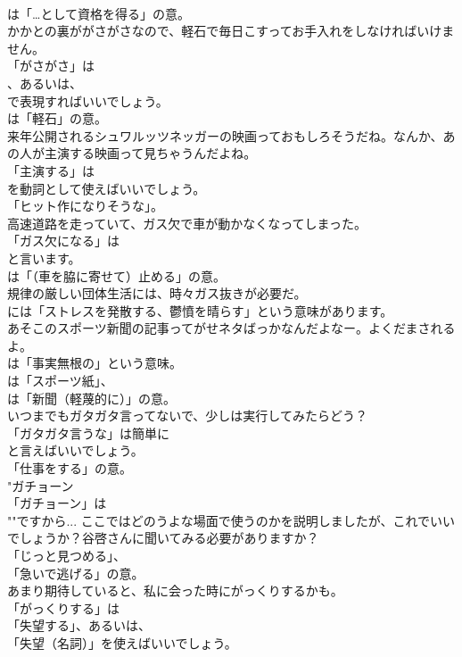 \documentclass[8pt]{extreport}
\begin{document}
\begin{CJK}{UTF8}{min}
\\	は「…として資格を得る」の意。	
\\	かかとの裏ががさがさなので、軽石で毎日こすってお手入れをしなければいけません。 
\\	「がさがさ」は 
\\	、あるいは、
\\	で表現すればいいでしょう。
\\	は「軽石」の意。	
\\	来年公開されるシュワルッツネッガーの映画っておもしろそうだね。なんか、あの人が主演する映画って見ちゃうんだよね。 
\\	「主演する」は
\\	を動詞として使えばいいでしょう。
\\	「ヒット作になりそうな」。	
\\	高速道路を走っていて、ガス欠で車が動かなくなってしまった。 
\\	「ガス欠になる」は 
\\	と言います。
\\	は「（車を脇に寄せて）止める」の意。	
\\	規律の厳しい団体生活には、時々ガス抜きが必要だ。 
\\	には「ストレスを発散する、鬱憤を晴らす」という意味があります。	
\\	あそこのスポーツ新聞の記事ってがせネタばっかなんだよなー。よくだまされるよ。 
\\	は「事実無根の」という意味。
\\	は「スポーツ紙」、
\\	は「新聞（軽蔑的に）」の意。	
\\	いつまでもガタガタ言ってないで、少しは実行してみたらどう？ 
\\	「ガタガタ言うな」は簡単に
\\	と言えばいいでしょう。
\\	「仕事をする」の意。	
\\	"ガチョーン 
\\	「ガチョーン」は
\\	""ですから... ここではどのうよな場面で使うのかを説明しましたが、これでいいでしょうか？谷啓さんに聞いてみる必要がありますか？
\\	「じっと見つめる」、
\\	「急いで逃げる」の意。
\\	あまり期待していると、私に会った時にがっくりするかも。 
\\	「がっくりする」は
\\	「失望する」、あるいは、
\\	「失望（名詞）」を使えばいいでしょう。	

\end{CJK}
\end{document}

